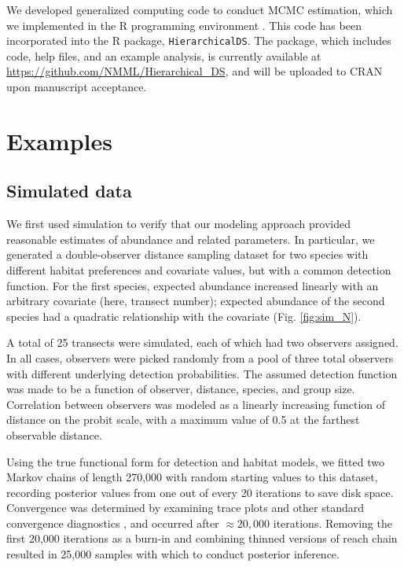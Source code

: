\documentclass[10pt]{article}
\begin{document}
We developed generalized computing code to conduct MCMC estimation, which we implemented in the R programming environment \cite{RTeam2007}.  This code has been incorporated into the R package, {\tt HierarchicalDS}.  The package, which includes code, help files, and an example analysis, is currently available at \\ \url{https://github.com/NMML/Hierarchical_DS}, and will be uploaded to CRAN upon manuscript acceptance.


\section*{Examples}

\subsection*{Simulated data}

We first used simulation to verify that our modeling approach provided reasonable estimates of abundance and related parameters.  In particular, we generated a double-observer distance sampling dataset for two species with different habitat preferences and covariate values, but with a common detection function.  For the first species, expected abundance increased linearly with an arbitrary covariate (here, transect number); expected abundance of the second species had a quadratic relationship with the covariate (Fig. \ref{fig:sim_N}).

A total of 25 transects were simulated, each of which had two observers assigned.
In all cases, observers were picked randomly from a pool of three total observers with different underlying detection probabilities.  The assumed detection function was made to be a function of observer, distance, species, and group size.  Correlation between observers was modeled as a linearly increasing function of distance on the probit scale, with a maximum value of 0.5 at the farthest observable distance.

Using the true functional form for detection and habitat models, we fitted two Markov chains of length 270,000 with random starting values to this dataset, recording posterior values from one out of every 20 iterations to save disk space.  Convergence was determined by examining trace plots and other standard convergence diagnostics \cite{GelmanEtAl2004}, and occurred after $\approx 20,000$ iterations. Removing the first 20,000 iterations as a burn-in and combining thinned versions of reach chain resulted in 25,000 samples with which to conduct posterior inference.
\end{document}
